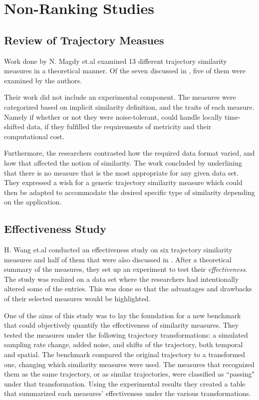 \section{Non-Ranking Studies}

\subsection{Review of Trajectory Measues}
Work done by N. Magdy et.al examined 13  different trajectory similarity measures\cite{24-ReviewTrajectory} in a theoretical manner.  
Of the seven discussed in , five of them were examined by the authors.

Their work did not include an experimental component. 
The measures were categorized based on implicit similarity definition, and the traits of each measure.
Namely if whether or not they were noise-tolerant, could handle locally time-shifted data, if they fulfilled the requirements of metricity and their computational cost.

Furthermore, the researchers contrasted how the required data format varied, and how that affected the notion of similarity.
The work concluded by underlining that there is no measure that is the most appropriate for any given data set. 
They expressed a wish for a generic trajectory similarity measure which could then be adapted to accommodate the desired specific type of similarity depending on the application. 

\subsection{Effectiveness Study}
H. Wang et.al conducted an eﬀectiveness study on six trajectory similarity measures\cite{8-EffectivenessStudy} and half of them that were also discussed in . 
After a theoretical summary of the measures, they set up an experiment to test their \textit{effectiveness}.
The study was realized on a data set where the researchers had intentionally altered some of the entries. This was done so that the advantages and drawbacks of their selected measures would be highlighted.


One of the aims of this study was to lay the foundation for a new benchmark that could objectively quantify the effectiveness of similarity measures. 
They tested the measures under the following trajectory transformations: a simulated sampling rate change, added noise, and shifts of the trajectory, both temporal and spatial. 
The benchmark compared the original trajectory to a transformed one, changing which similarity measures were used. 
The measures that recognized them as the same trajectory, or as similar trajectories, were classified as “passing" under that transformation. 
Using the experimental results they created a table that summarized each measures' effectiveness under the various transformations.



